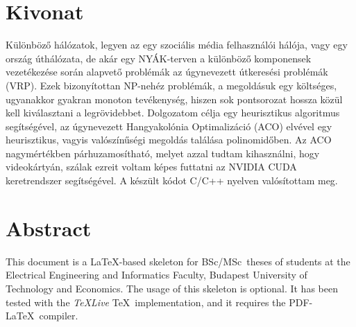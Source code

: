 \setcounter{page}{1}

\selecthungarian

\chapter*{Kivonat}

Különböző hálózatok, legyen az egy szociális média felhasználói hálója, vagy egy ország úthálózata, de akár egy NYÁK-terven a különböző komponensek vezetékezése során alapvető problémák az úgynevezett útkeresési problémák (VRP). Ezek bizonyítottan NP-nehéz problémák, a megoldásuk egy költséges, ugyanakkor gyakran monoton tevékenység, hiszen sok pontsorozat hossza közül kell kiválasztani a legrövidebbet. Dolgozatom célja egy heurisztikus algoritmus segítségével, az úgynevezett Hangyakolónia Optimalizáció (ACO) elvével egy heurisztikus, vagyis valószínűségi megoldás találása polinomidőben. Az ACO nagymértékben párhuzamosítható, melyet azzal tudtam kihasználni, hogy videokártyán, szálak ezreit voltam képes futtatni az NVIDIA CUDA keretrendszer segítségével. A készült kódot C/C++ nyelven valósítottam meg.



\vfill
\selectenglish


\chapter*{Abstract}

This document is a \LaTeX-based skeleton for BSc/MSc~theses of students at the Electrical Engineering and Informatics Faculty, Budapest University of Technology and Economics. The usage of this skeleton is optional. It has been tested with the \emph{TeXLive} \TeX~implementation, and it requires the PDF-\LaTeX~compiler.


\vfill
\selectthesislanguage

\setcounter{romanPage}{\value{page}}
